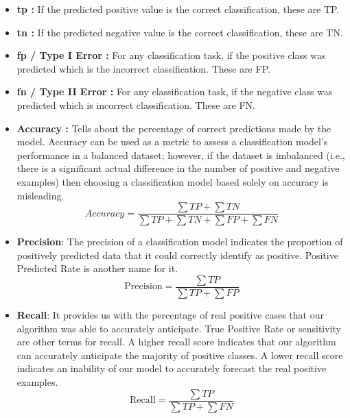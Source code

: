 \begin{itemize}
    \item \textbf{\acrfull{tp} : } If the predicted positive value is the correct classification, these are TP.
    \item \textbf{\acrfull{tn} : }  If the predicted negative value is the correct classification, these are TN.
    \item \textbf{\acrfull{fp} / Type I Error : } For any classification task, if the positive class was predicted which is the incorrect classification. These are FP.
    \item \textbf{\acrfull{fn} / Type II Error : } For any classification task, if the negative class was predicted which is incorrect classification. These are FN.
    \item \textbf{Accuracy : } Tells about the percentage of correct predictions made by the model. Accuracy can be used as a metric to assess a classification model's performance in a balanced dataset; however, if the dataset is imbalanced (i.e., there is a significant actual difference in the number of positive and negative examples) then choosing a classification model based solely on accuracy is misleading.
    \begin{equation} \label{eq:accuracy}
        Accuracy = \frac{\sum TP + \sum TN}{\sum TP + \sum TN + \sum FP + \sum FN}
    \end{equation}
    \item \textbf{Precision}: The precision of a classification model indicates the proportion of positively predicted data that it could correctly identify as positive. Positive Predicted Rate is another name for it.
    \begin{equation}\label{eq:precision}
        \text{Precision} = \frac{\sum TP}{\sum TP + \sum FP}
    \end{equation}
    
    \item \textbf{Recall}: It provides us with the percentage of real positive cases that our algorithm was able to accurately anticipate. True Positive Rate or sensitivity are other terms for recall. A higher recall score indicates that our algorithm can accurately anticipate the majority of positive classes. A lower recall score indicates an inability of our model to accurately forecast the real positive examples.
    \begin{equation}\label{eq:recall}
        \text{Recall} = \frac{\sum TP}{\sum TP + \sum FN}
    \end{equation}
    

\end{itemize}
